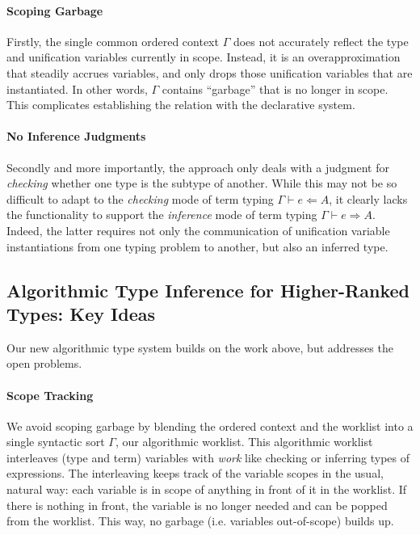 \paragraph{Scoping Garbage} Firstly, the single common ordered context 
$\Gamma$ does not accurately reflect the type and unification variables
currently in scope. Instead, it is an overapproximation that steadily accrues
variables, and only drops those unification variables that are instantiated.
In other words, $\Gamma$ contains ``garbage'' that is no longer in scope.
This complicates establishing the relation with the declarative system.


\paragraph{No Inference Judgments} 
Secondly and more importantly, the approach only deals with a judgment for
\emph{checking} whether one type is the subtype of another. While this may not
be so difficult to adapt to the \emph{checking} mode of term typing $\Gamma
\vdash e \Leftarrow A$, it clearly lacks the functionality to support the
\emph{inference} mode of term typing $\Gamma \vdash e \Rightarrow A$. Indeed,
the latter requires not only the communication of unification variable
instantiations from one typing problem to another, but also an inferred type.

\subsection{Algorithmic Type Inference for Higher-Ranked Types: Key Ideas}

Our new algorithmic type system builds on the work above, but
addresses the open problems.

\paragraph{Scope Tracking}
We avoid scoping garbage by blending the ordered context and the
worklist into a single syntactic sort $\Gamma$, our algorithmic worklist. This
algorithmic worklist interleaves (type and term) variables with \emph{work}
like checking or inferring types of expressions. The interleaving keeps track
of the variable scopes in the usual, natural way: each variable is in scope of
anything in front of it in the worklist. If there is nothing in front, the
variable is no longer needed and can be popped from the worklist. This way, no
garbage (i.e. variables out-of-scope) builds up.

